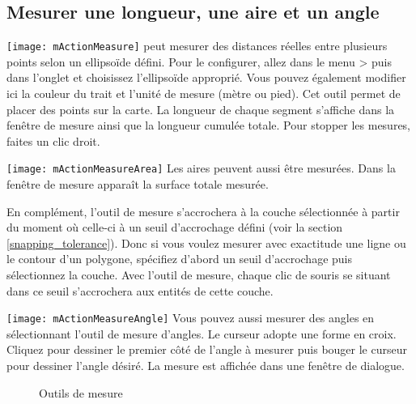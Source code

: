 \subsection{Mesurer une longueur, une aire et un angle}

\texttt{[image: mActionMeasure]} 
\qg peut mesurer des distances réelles entre plusieurs points selon un ellipsoïde défini. Pour le configurer, allez dans le menu  > puis dans l'onglet  et choisissez l'ellipsoïde approprié. Vous pouvez également modifier ici la couleur du trait et l'unité de mesure (mètre ou pied). Cet outil permet de placer des points sur la carte. La longueur de chaque segment s'affiche dans la fenêtre de mesure ainsi que la longueur cumulée totale. Pour stopper les mesures, faites un clic droit. \par
\texttt{[image: mActionMeasureArea]} Les aires peuvent aussi être mesurées.
Dans la fenêtre de mesure apparaît la surface totale mesurée. \par
En complément, l'outil de mesure s'accrochera à la couche sélectionnée à partir du moment où celle-ci à un seuil d'accrochage défini (voir la section \ref{snapping_tolerance}). Donc si vous voulez mesurer avec exactitude une ligne ou le contour d'un polygone, spécifiez d'abord un seuil d'accrochage puis sélectionnez la couche. Avec l'outil de mesure, chaque clic de souris se situant dans ce seuil s'accrochera aux entités de cette couche. \par
\texttt{[image: mActionMeasureAngle]}
Vous pouvez aussi mesurer des angles en sélectionnant l'outil de mesure d'angles. Le curseur adopte une forme en croix. Cliquez pour dessiner le premier côté de l'angle à mesurer puis bouger le curseur pour dessiner l'angle désiré. La mesure est affichée dans une fenêtre de dialogue.

\begin{figure}[ht]
\centering
  \hspace{0.5cm}
  \hspace{0.5cm}
  \caption{Outils de mesure \nixcaption} \label{fig:measure}
\end{figure}

